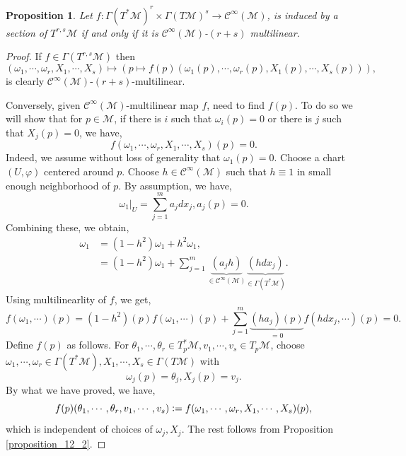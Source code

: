 \documentclass[10pt]{article}
\newtheorem{proposition}{Proposition}[section]
\newcommand{\defeq}{\vcentcolon=}
\newcommand{\M}[0]{\mathcal{M}}
\newcommand{\cinf}[0]{\mathcal{C}^\infty}
\begin{document}
\begin{proposition}
  \label{proposition_12_4}
  Let $f:\Gamma(T^*\M)^r\times \Gamma(T\M)^s \to\cinf(\M)$, is induced by a section of $T^{r,s}\M$ if and only if it is $\cinf(\M)$-$(r+s)$ multilinear.
\end{proposition}
\begin{proof} If $f\in\Gamma(T^{r,s}\M)$ then 
\begin{equation*}
  (\omega_1,\cdots,\omega_r,X_1,\cdots,X_s)\mapsto (p\mapsto f(p)(\omega_1(p),\cdots,\omega_r(p),X_1(p),\cdots, X_s(p))),
\end{equation*}
is clearly $\cinf(\M)$-$(r+s)$-multilinear.
\par Conversely, given $\cinf(\M)$-multilinear map $f$, need to find $f(p)$. To do so we will show that for $p\in\M$, if there is $i$ such that $\omega_i(p) = 0$ or there is $j$ such that $X_j(p)=0$, we have,
\begin{equation*}
  f(\omega_1,\cdots,\omega_r,X_1,\cdots,X_s)(p) = 0.
\end{equation*}
Indeed, we assume without loss of generality that $\omega_1(p)=0$. Choose a chart $(U,\varphi)$ centered around $p$. Choose $h\in\cinf(\M)$ such that $h\equiv 1$ in small enough neighborhood of $p$. By assumption, we have,
\begin{equation*}
  \omega_1|_U = \sum_{j=1}^ma_jdx_j, a_j(p) = 0.
\end{equation*}
Combining these, we obtain,
\begin{align*}
  \omega_1 & = (1-h^2)\omega_1+h^2\omega_1,\\
  &= (1-h^2)\omega_1+\sum_{j=1}^m\underbrace{(a_jh)}_{\in\cinf(\M)}\underbrace{(hdx_j)}_{\in\Gamma(T^*\M)}.
\end{align*}
Using multilinearlity of $f$, we get,
\begin{equation*}
  f(\omega_1,\cdots)(p) = (1-h^2)(p)f(\omega_1,\cdots)(p)+\sum_{j=1}^m\underbrace{(ha_j)(p)}_{=0}f(hdx_j,\cdots)(p) = 0.
\end{equation*}
Define $f(p)$ as follows. For $\theta_1,\cdots,\theta_r\in T^*_p\M,v_1,\cdots,v_s\in T_p\M$, choose $\omega_1,\cdots,\omega_r\in\Gamma(T^*\M),X_1,\cdots,X_s\in\Gamma(T\M)$ with 
\begin{equation*}
  \omega_j(p) = \theta_j,X_j(p) = v_j.
\end{equation*}
By what we have proved, we have,
\begin{equation*}
  f(p)(\theta_1,\cdots,\theta_r,v_1,\cdots,v_s) \defeq f(\omega_1,\cdots,\omega_r,X_1,\cdots,X_s)(p),
\end{equation*}
which is independent of choices of $\omega_j,X_j$. The rest follows from Proposition \ref{proposition_12_2}.
\end{proof}
\end{document}
